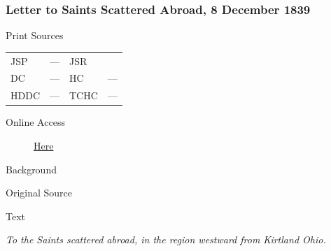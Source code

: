 		\subsubsection{Letter to Saints Scattered Abroad, 8 December 1839}
			\label{EMS-1839-JS-8-DEC-1839}
			
			\begin{description}
				\item[Print Sources]
			\end{description}

				\begin{tabular}{p{0.5in}p{1in}p{0.5in}p{1in}}
				JSP	 	& ---		& JSR 		&  \\
				DC	 	& ---		& HC 		& --- \\
				HDDC 	& ---		& TCHC 		& --- \\
				\end{tabular}
			
			\begin{description}
				\item[Online Access] \href{https://www.josephsmithpapers.org/paper-summary/letter-to-saints-scattered-abroad-8-december-1839/1}{Here}
			\end{description}
			
			\begin{description}
				\item[Background]
			\end{description}
			
			
			\begin{description}
				\item[Original Source]
			\end{description}
			
			
			\begin{description}
				\item[Text]
			\end{description}
			

				\textit{To the Saints scattered abroad, in the region westward from Kirtland Ohio.}

